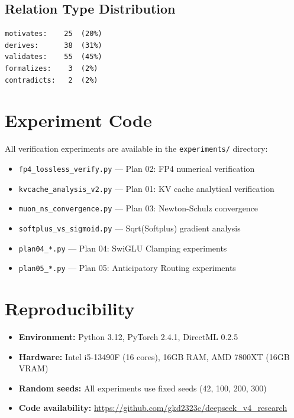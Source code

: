 \documentclass[11pt,a4paper]{article}
\begin{document}
\subsection{Relation Type Distribution}

\begin{verbatim}
motivates:    25  (20%)
derives:      38  (31%)
validates:    55  (45%)
formalizes:    3  (2%)
contradicts:   2  (2%)
\end{verbatim}

\section{Experiment Code}
\label{app:code}

All verification experiments are available in the \texttt{experiments/} directory:

\begin{itemize}
    \item \texttt{fp4\_lossless\_verify.py} --- Plan 02: FP4 numerical verification
    \item \texttt{kvcache\_analysis\_v2.py} --- Plan 01: KV cache analytical verification
    \item \texttt{muon\_ns\_convergence.py} --- Plan 03: Newton-Schulz convergence
    \item \texttt{softplus\_vs\_sigmoid.py} --- Sqrt(Softplus) gradient analysis
    \item \texttt{plan04\_*.py} --- Plan 04: SwiGLU Clamping experiments
    \item \texttt{plan05\_*.py} --- Plan 05: Anticipatory Routing experiments
\end{itemize}

\section{Reproducibility}
\label{app:reproducibility}

\begin{itemize}
    \item \textbf{Environment:} Python 3.12, PyTorch 2.4.1, DirectML 0.2.5
    \item \textbf{Hardware:} Intel i5-13490F (16 cores), 16GB RAM, AMD 7800XT (16GB VRAM)
    \item \textbf{Random seeds:} All experiments use fixed seeds (42, 100, 200, 300)
    \item \textbf{Code availability:} \url{https://github.com/gkd2323c/deepseek_v4_research}
\end{itemize}
\end{document}
